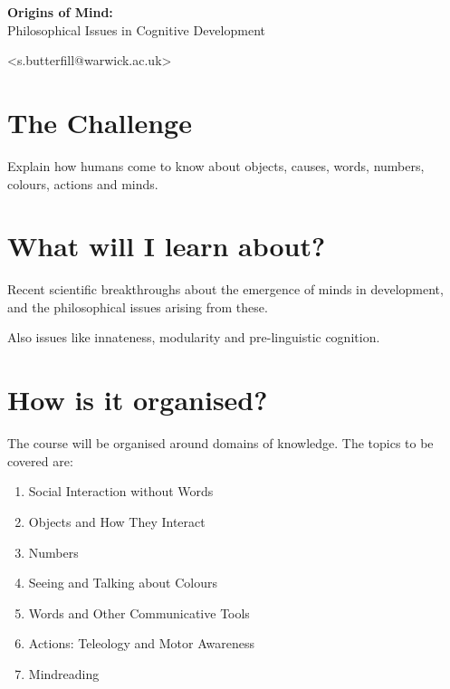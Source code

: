 \documentclass[12pt]{extarticle}
\date{}
\begin{document}
\begin{multicols}{3}

\setlength\footnotesep{1em}







\begin{center}
{\Large
\textbf{Origins of Mind:}
\\ {Philosophical Issues in Cognitive Development}
}


<s.butterfill@warwick.ac.uk>

\end{center}



\section{The Challenge}
Explain how humans come to know about objects, causes, words, numbers, colours, actions and minds.

\section{What will I learn about?}
Recent scientific breakthroughs about the emergence of minds in development, and the philosophical issues arising from these.

Also issues like innateness, modularity and pre-linguistic cognition.

\section{How is it organised?}
The course will be organised around domains of knowledge.
The topics to be covered are:
\begin{enumerate}
\item Social Interaction without Words
\item Objects and How They Interact
\item Numbers
\item Seeing and Talking about Colours
\item Words and Other Communicative Tools
\item Actions: Teleology and Motor Awareness
\item Mindreading
\end{enumerate}


\end{multicols}
\end{document}
